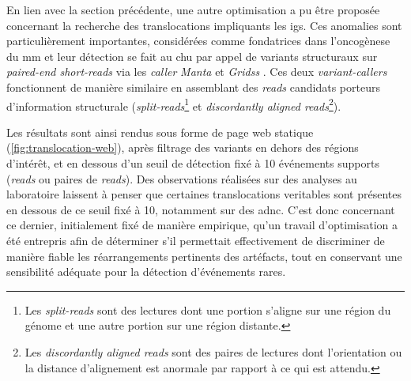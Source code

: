 En lien avec la section précédente, une autre optimisation a pu être proposée concernant la recherche des translocations impliquants les \glspl{ig}.
Ces anomalies sont particulièrement importantes, considérées comme fondatrices dans l'oncogènese du \gls{mm} et leur détection se fait au \gls{chu} 
par appel de variants structuraux sur \textit{paired-end short-reads} via les \textit{caller} \textit{Manta} \cite{chenMantaRapidDetection2016a} et 
\textit{Gridss} \cite{cameronGRIDSSSensitiveSpecific2017a}. Ces deux \textit{variant-callers} fonctionnent de manière similaire en assemblant des \textit{reads} candidats
porteurs d'information structurale (\textit{split-reads}\footnote{Les \textit{split-reads} sont des lectures dont une portion s'aligne sur une région du génome 
et une autre portion sur une région distante.} et \textit{discordantly aligned reads}\footnote{Les \textit{discordantly aligned reads} 
sont des paires de lectures dont l'orientation ou la distance d'alignement est anormale par rapport à ce qui est attendu.}).

\vspace{1em}

Les résultats sont ainsi rendus sous forme de page web statique (\autoref{fig:translocation-web}), après filtrage des variants en dehors des régions d'intérêt, et en dessous d'un seuil 
de détection fixé à 10 événements supports (\textit{reads} ou paires de \textit{reads}). Des observations réalisées sur des analyses au laboratoire 
laissent à penser que certaines translocations veritables sont présentes en dessous de ce seuil fixé à 10, notamment sur des \gls{adnc}.
C'est donc concernant ce dernier, initialement fixé de manière empirique, qu'un travail d'optimisation a été entrepris afin de déterminer 
s'il permettait effectivement de discriminer de manière fiable les réarrangements pertinents des artéfacts, tout en conservant une sensibilité adéquate 
pour la détection d'événements rares. 


